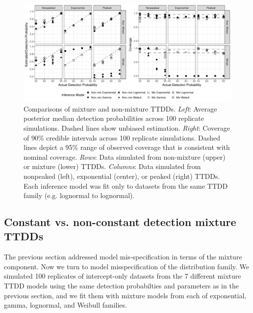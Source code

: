 \documentclass[12pt]{article}
\begin{document}
\begin{figure}\centering
\includegraphics[width=\textwidth]{"Sims/SimZero/mixture_fig"} %
\caption{
Comparisons of mixture and non-mixture TTDDs.  \textit{Left}: Average posterior median detection probabilities across 100 replicate simulations.  Dashed lines show unbiased estimation.   \textit{Right}: Coverage of 90\% credible intervals across 100 replicate simulations.  Dashed lines depict a 95\% range of observed coverage that is consistent with nominal coverage.  \textit{Rows}: Data simulated from non-mixture (upper) or mixture (lower) TTDDs.  \textit{Columns}:  Data simulated from nonpeaked (left), exponential (center), or peaked (right) TTDDs.  Each inference model was fit only to datasets from the same TTDD family (e.g. lognormal to lognormal).
}
\label{fig:mixture_fig} 
\end{figure}



\subsection{Constant vs. non-constant detection mixture TTDDs}\label{sec:family}

The previous section addressed model mis-specification in terms of the mixture component. 
Now we turn to model misspecification of the distribution family. 
We simulated 100 replicates of intercept-only datasets from the 7 different mixture TTDD models using the same detection probabilties and parameters as in the previous section, and we fit them with mixture models from each of exponential, gamma, lognormal, and Weibull families.
\end{document}
